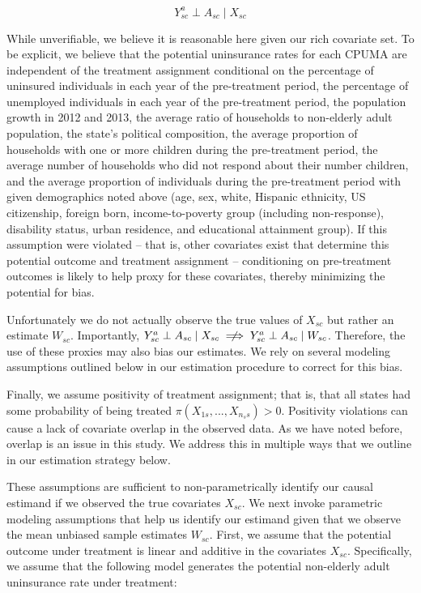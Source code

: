 \documentclass[12pt]{article}
\begin{document}
$$
Y_{sc}^a \perp A_{sc} \mid X_{sc}
$$

While unverifiable, we believe it is reasonable here given our rich covariate set. To be explicit, we believe that the potential uninsurance rates for each CPUMA are independent of the treatment assignment conditional on the percentage of uninsured individuals in each year of the pre-treatment period, the percentage of unemployed individuals in each year of the pre-treatment period, the population growth in 2012 and 2013, the average ratio of households to non-elderly adult population, the state's political composition, the average proportion of households with one or more children during the pre-treatment period, the average number of households who did not respond about their number children, and the average proportion of individuals during the pre-treatment period with given demographics noted above (age, sex, white, Hispanic ethnicity, US citizenship, foreign born, income-to-poverty group (including non-response), disability status, urban residence, and educational attainment group). If this assumption were violated -- that is, other covariates exist that determine this potential outcome and treatment assignment -- conditioning on pre-treatment outcomes is likely to help proxy for these covariates, thereby minimizing the potential for bias. 

Unfortunately we do not actually observe the true values of $X_{sc}$ but rather an estimate $W_{sc}$. Importantly, $Y_{sc}^a \perp A_{sc} \mid X_{sc} \centernot\implies Y_{sc}^a \perp A_{sc} \mid W_{sc}$. Therefore, the use of these proxies may also bias our estimates. We rely on several modeling assumptions outlined below in our estimation procedure to correct for this bias.

Finally, we assume positivity of treatment assignment; that is, that all states had some probability of being treated $\pi(X_{1s}, ..., X_{n_ss}) > 0$. Positivity violations can cause a lack of covariate overlap in the observed data. As we have noted before, overlap is an issue in this study. We address this in multiple ways that we outline in our estimation strategy below. 

These assumptions are sufficient to non-parametrically identify our causal estimand if we observed the true covariates $X_{sc}$. We next invoke parametric modeling assumptions that help us identify our estimand given that we observe the mean unbiased sample estimates $W_{sc}$. First, we assume that the potential outcome under treatment is linear and additive in the covariates $X_{sc}$. Specifically, we assume that the following model generates the potential non-elderly adult uninsurance rate under treatment:
\end{document}
